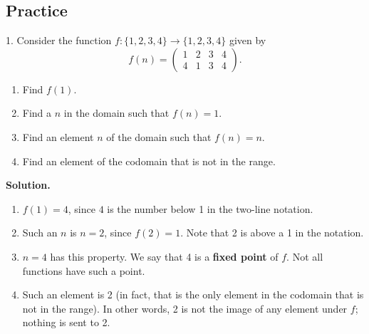 \documentclass[10pt,]{book}
\newcommand{\terminology}[1]{\textbf{#1}}
\theoremstyle{plain}
\theoremstyle{definition}
\theoremstyle{definition}
\numberwithin{equation}{chapter}
\newcommand{\twoline}[2]{\begin{pmatrix}#1 \\ #2 \end{pmatrix}}
\newcommand{\amp}{&}
\begin{document}
\subsection[{Practice}]{Practice}\label{practice_intro-functions}
\begin{exerciselist}
\item[1.]\hypertarget{exercise-43}{}\noindent%
\hypertarget{p-635}{}%
Consider the function \(f:\{1,2,3,4\} \to \{1,2,3,4\}\) given by%
\begin{equation*}
f(n) = \twoline{1 \amp 2 \amp 3 \amp 4}{4 \amp 1 \amp 3 \amp 4}.
\end{equation*}
%
\par
\hypertarget{p-636}{}%
\leavevmode%
\begin{enumerate}[label=(\alph*)]
\item\hypertarget{li-403}{}\hypertarget{p-637}{}%
Find \(f(1)\).  \framebox[5em]{\raisebox{1ex}{}}%
\item\hypertarget{li-404}{}\hypertarget{p-638}{}%
Find a \(n\) in the domain such that \(f(n) = 1\).   \framebox[5em]{\raisebox{1ex}{}}%
\item\hypertarget{li-405}{}\hypertarget{p-639}{}%
Find an element \(n\) of the domain such that \(f(n) = n\).   \framebox[5em]{\raisebox{1ex}{}}%
\item\hypertarget{li-406}{}\hypertarget{p-640}{}%
Find an element of the codomain that is not in the range.   \framebox[5em]{\raisebox{1ex}{}}%
\end{enumerate}
%
\par
\medskip\noindent%
\textbf{Solution.}\quad \hypertarget{p-641}{}%
\leavevmode%
\begin{enumerate}[label=(\alph*)]
\item\hypertarget{li-407}{}\hypertarget{p-642}{}%
\(f(1) = 4\), since \(4\) is the number below 1 in the two-line notation.%
\item\hypertarget{li-408}{}\hypertarget{p-643}{}%
Such an \(n\) is \(n= 2\), since \(f(2) = 1\).  Note that 2 is above a 1 in the notation.%
\item\hypertarget{li-409}{}\hypertarget{p-644}{}%
\(n = 4\) has this property.  We say that 4 is a \terminology{fixed point} of \(f\).  Not all functions have such a point.%
\item\hypertarget{li-410}{}\hypertarget{p-645}{}%
Such an element is 2 (in fact, that is the only element in the codomain that is not in the range).  In other words, 2 is not the image of any element under \(f\); nothing is sent to 2.%
\end{enumerate}

\end{exerciselist}
\end{document}

